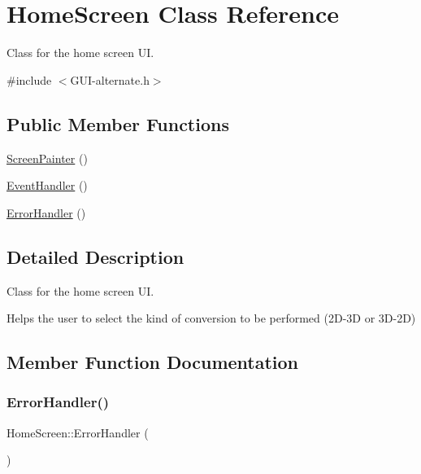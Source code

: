 \hypertarget{class_home_screen}{}\section{Home\+Screen Class Reference}
\label{class_home_screen}


Class for the home screen UI.  




{\ttfamily \#include $<$G\+U\+I-\/alternate.\+h$>$}

\subsection*{Public Member Functions}
\begin{DoxyCompactItemize}
\item 
\mbox{\hyperlink{class_home_screen_aab2d7fb46a2488713f38fb39a5cfc21b}{Screen\+Painter}} ()
\item 
\mbox{\hyperlink{class_home_screen_a4e7e2efcfd7caa30ce2098185a5e6009}{Event\+Handler}} ()
\item 
\mbox{\hyperlink{class_home_screen_ac0f769f5bf92706a7dceb72c23940432}{Error\+Handler}} ()
\end{DoxyCompactItemize}


\subsection{Detailed Description}
Class for the home screen UI. 

Helps the user to select the kind of conversion to be performed (2\+D-\/3D or 3\+D-\/2D) 

\subsection{Member Function Documentation}
\mbox{\label{class_home_screen_ac0f769f5bf92706a7dceb72c23940432}} 
\subsubsection{\texorpdfstring{Error\+Handler()}{ErrorHandler()}}
{\footnotesize\ttfamily Home\+Screen\+::\+Error\+Handler (\begin{DoxyParamCaption}{ }\end{DoxyParamCaption})}

